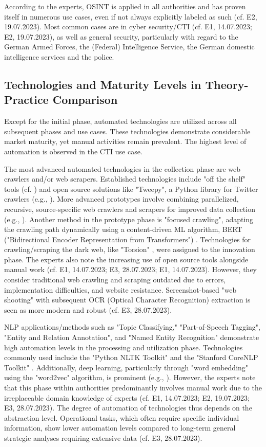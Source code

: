 \documentclass[10pt]{article}
\begin{document}
According to the experts, OSINT is applied in all authorities and has proven itself
in numerous use cases, even if not always explicitly labeled as such (cf. E2, 19.07.2023).
Most common cases are in cyber security/CTI (cf. E1, 14.07.2023; E2, 19.07.2023), as well as general security,
particularly with regard to the German Armed Forces, the (Federal) Intelligence Service,
the German domestic intelligence services and the police.

\subsection{Technologies and Maturity Levels in Theory-Practice Comparison}

Except for the initial phase, automated technologies are utilized across all subsequent phases and use cases.
These technologies demonstrate considerable market maturity, yet manual activities remain prevalent.
The highest level of automation is observed in the CTI use case.

The most advanced automated technologies in the collection phase are web crawlers and/or web scrapers.
Established technologies include "off the shelf" tools (cf. \cite{Middleton.2020}) and open source
solutions like "Tweepy", a Python library for Twitter crawlers (e.g., \cite{Adewopo.2020}).
More advanced prototypes involve combining parallelized, recursive, source-specific web crawlers and scrapers for improved
data collection (e.g., \cite{Jenkins.2021}). Another method in the prototype phase is
"focused crawling", adapting the crawling path dynamically using a content-driven ML algorithm, BERT ("Bidirectional Encoder Representation from Transformers")
\cite{Kuehn.2023}. Technologies for crawling/scraping the dark web, like "Torsion" \cite{Sonawane.2022},
were assigned to the innovation phase. The experts also note the increasing use of open source tools alongside manual work
(cf. E1, 14.07.2023; E3, 28.07.2023; E1, 14.07.2023). However, they consider traditional web crawling and scraping
outdated due to errors, implementation difficulties, and website resistance. Screenshot-based "web shooting" with
subsequent OCR (Optical Character Recognition) extraction is seen as more modern and robust (cf. E3, 28.07.2023).

NLP applications/methods such as "Topic Classifying," "Part-of-Speech Tagging", "Entity and Relation Annotation", and "Named Entity Recognition"
demonstrate high automation levels in the processing and utilization phase. Technologies commonly used include
the "Python NLTK Toolkit" \cite{Hubbard.2022} and the "Stanford CoreNLP Toolkit" \cite{Middleton.2020}.
Additionally, deep learning, particularly through "word embedding" using the "word2vec" algorithm, is prominent
(e.g., \cite{Bai.2020}). However, the experts note that
this phase within authorities predominantly involves manual work due to the irreplaceable domain knowledge of experts
(cf. E1, 14.07.2023; E2, 19.07.2023; E3, 28.07.2023). The degree of automation of technologies thus depends on the abstraction level.
Operational tasks, which often require specific individual information, show lower automation levels compared to long-term general strategic analyses
requiring extensive data (cf. E3, 28.07.2023).
\end{document}
